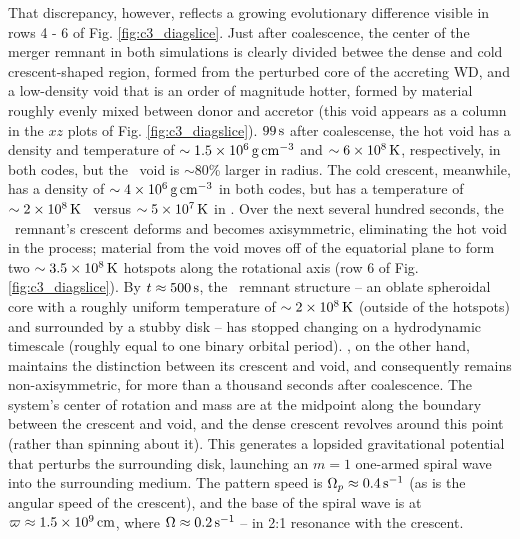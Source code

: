 
That discrepancy, however, reflects a growing evolutionary difference visible in rows 4 - 6 of Fig. \ref{fig:c3_diagslice}.  Just after coalescence, the center of the merger remnant in both simulations is clearly divided betwee the dense and cold crescent-shaped region, formed from the perturbed core of the accreting WD, and a low-density void that is an order of magnitude hotter, formed by material roughly evenly mixed between donor and accretor (this void appears as a column in the $xz$ plots of Fig. \ref{fig:c3_diagslice}).  $99\,\mathrm{s}$ after coalescense, the hot void has a density and temperature of $\sim1.5\times10^6\,\gcc$ and $\sim6\times10^8\,\mathrm{K}$, respectively, in both codes, but the \arepo\ void is $\sim80$\% larger in radius.  The cold crescent, meanwhile, has a density of $\sim4\times10^6\,\gcc$ in both codes, but has a temperature of $\sim2\times10^8\,\mathrm{K}$ \gasoline\ versus $\sim5\times10^7\,\mathrm{K}$ in \arepo.  Over the next several hundred seconds, the \gasoline\ remnant's crescent deforms and becomes axisymmetric, eliminating the hot void in the process; material from the void moves off of the equatorial plane to form two $\sim3.5\times10^8\,\mathrm{K}$ hotspots along the rotational axis (row 6 of Fig. \ref{fig:c3_diagslice}).  By $t\approx500\,\mathrm{s}$, the \gasoline\ remnant structure -- an oblate spheroidal core with a roughly uniform temperature of $\sim 2 \times 10^8\,\mathrm{K}$ (outside of the hotspots) and surrounded by a stubby disk -- has stopped changing on a hydrodynamic timescale (roughly equal to one binary orbital period).  \arepo, on the other hand, maintains the distinction between its crescent and void, and consequently remains non-axisymmetric, for more than a thousand seconds after coalescence.  The system's center of rotation and mass are at the midpoint along the boundary between the crescent and void, and the dense crescent revolves around this point (rather than spinning about it).  This generates a lopsided gravitational potential that perturbs the surrounding disk, launching an $m = 1$ one-armed spiral wave into the surrounding medium.  The pattern speed is $\Omega_p \approx 0.4\,\mathrm{s}^{-1}$ (as is the angular speed of the crescent), and the base of the spiral wave is at $\varpi \approx 1.5\times10^9\,\mathrm{cm}$, where $\Omega \approx 0.2\,\mathrm{s}^{-1}$ -- in 2:1 resonance with the crescent.

